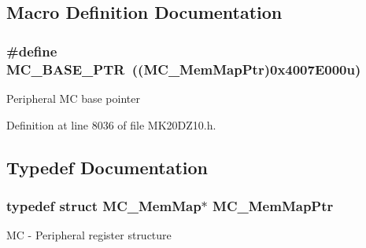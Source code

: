 \subsection{Macro Definition Documentation}
\subsubsection[{\texorpdfstring{M\+C\+\_\+\+B\+A\+S\+E\+\_\+\+P\+TR}{MC_BASE_PTR}}]{\setlength{\rightskip}{0pt plus 5cm}\#define M\+C\+\_\+\+B\+A\+S\+E\+\_\+\+P\+TR~(({\bf M\+C\+\_\+\+Mem\+Map\+Ptr})0x4007\+E000u)}\hypertarget{group___m_c___peripheral_gaaceb8e18ec89863925b35b4e058bcd7e}{}\label{group___m_c___peripheral_gaaceb8e18ec89863925b35b4e058bcd7e}
Peripheral MC base pointer 

Definition at line 8036 of file M\+K20\+D\+Z10.\+h.



\subsection{Typedef Documentation}
\subsubsection[{\texorpdfstring{M\+C\+\_\+\+Mem\+Map\+Ptr}{MC_MemMapPtr}}]{\setlength{\rightskip}{0pt plus 5cm}typedef struct {\bf M\+C\+\_\+\+Mem\+Map}$\ast$ {\bf M\+C\+\_\+\+Mem\+Map\+Ptr}}\hypertarget{group___m_c___peripheral_gaf8e0db4524de5478847695b38cd4d570}{}\label{group___m_c___peripheral_gaf8e0db4524de5478847695b38cd4d570}
MC -\/ Peripheral register structure 